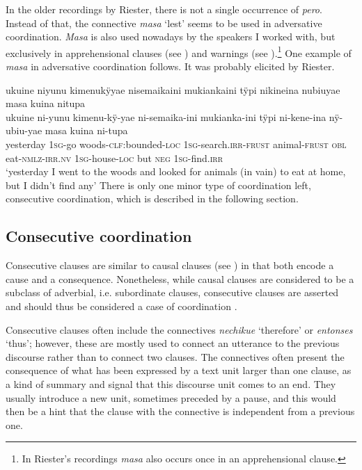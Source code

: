 In the older recordings by Riester, there is not a single occurrence of \textit{pero}. Instead of that, the connective \textit{masa} ‘lest’ seems to be used in adversative coordination. \textit{Masa} is also used nowadays by the speakers I worked with, but exclusively in apprehensional clauses (see ) and warnings (see ).\footnote{In Riester’s recordings \textit{masa} also occurs once in an apprehensional clause.} One example of \textit{masa} in adversative coordination follows. It was probably elicited by Riester.


\ea\label{ex:masa-but}
\begingl
\glpreamble ukuine niyunu kimenukÿyae nisemaikaini mukiankaini tÿpi nikineina nubiuyae masa kuina nitupa\\
\gla ukuine ni-yunu kimenu-kÿ-yae ni-semaika-ini mukianka-ini tÿpi ni-kene-ina nÿ-ubiu-yae masa kuina ni-tupa\\
\glb yesterday 1\textsc{sg}-go woods-\textsc{clf:}bounded-\textsc{loc} 1\textsc{sg}-search.\textsc{irr}-\textsc{frust} animal-\textsc{frust} \textsc{obl} eat-\textsc{nmlz}-\textsc{irr.nv} 1\textsc{sg}-house-\textsc{loc} but \textsc{neg} 1\textsc{sg}-find.\textsc{irr}\\
\glft ‘yesterday I went to the woods and looked for animals (in vain) to eat at home, but I didn’t find any’
\endgl
\trailingcitation{[nxx-a630101g-1.62]}
\xe
{}
There is only one minor type of coordination left, consecutive coordination, which is described in the following section.

\subsection{Consecutive coordination}\label{sec:ConsecutiveCoordination}

Consecutive clauses are similar to causal clauses (see ) in that both encode a cause and a consequence. Nonetheless, while causal clauses are considered to be a subclass of adverbial, i.e. subordinate clauses, consecutive clauses are asserted and should thus be considered a case of coordination \citep[cf.][38]{Cristofaro2003}.

Consecutive clauses often include the connectives \textit{nechikue} ‘therefore’ or \textit{entonses} ‘thus’; however, these are mostly used to connect an utterance to the previous discourse rather than to connect two clauses. The connectives often present the consequence of what has been expressed by a text unit larger than one clause, as a kind of summary and signal that this discourse unit comes to an end. They usually introduce a new  unit, sometimes preceded by a pause, and this would then be a hint that the clause with the connective is independent from a previous one. 

